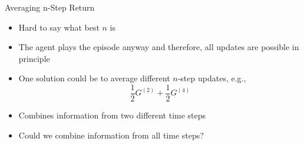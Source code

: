 \documentclass[aspectratio=169]{../latex_main/tntbeamer}  %
\begin{document}
\begin{frame}[c]{Averaging n-Step Return}
	
	\begin{itemize}
		\item Hard to say what best $n$ is
		\item The agent plays the episode anyway and therefore, all updates are possible in principle
		\item One solution could be to average different $n$-step updates, e.g.,
		$$ \frac{1}{2}G^{(2)} + \frac{1}{2}G^{(4)}$$
		\item Combines information from two different time steps
		\item Could we combine information from all time steps?
	\end{itemize}
	
\end{frame}
\end{document}
